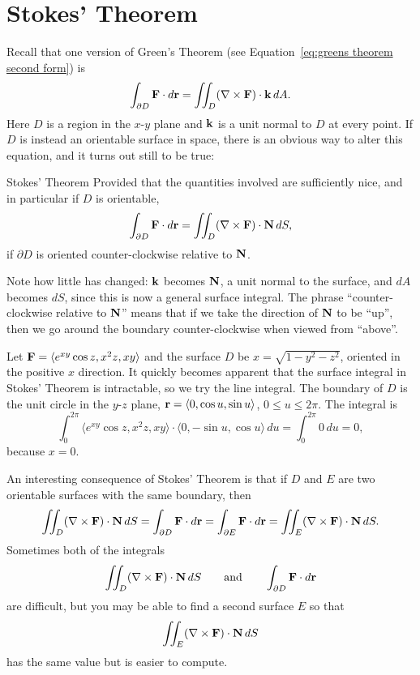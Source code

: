 \section{Stokes' Theorem}\label{sec:StokesTheorem}

Recall that one version of Green's Theorem (see
Equation~\ref{eq:greens theorem second form}) is
$$\int_{\partial D} {\bf F}\cdot d{\bf r}
=\iint_{D}(\nabla\times {\bf F})\cdot{\bf k}\,dA.
$$
Here $D$ is a region in the $x$-$y$ plane and $\bf k$ is a unit normal
to $D$ at every point. If $D$ is instead an orientable surface in
space, there is an obvious way to alter this equation, and it turns
out still to be true:

\begin{theorem}{Stokes' Theorem}{}
Provided that the quantities involved are
sufficiently nice, and in particular if $D$ is orientable, 
$$\int_{\partial D} {\bf F}\cdot d{\bf r}
=\iint_{D}(\nabla\times {\bf F})\cdot{\bf N}\,dS,$$
if $\partial D$ is oriented counter-clockwise relative to $\bf N$.
\end{theorem}

Note how little has changed: $\bf k$ becomes $\bf N$, a unit normal to
the surface, and $dA$ becomes $dS$, since this is now a general
surface integral. The phrase ``counter-clockwise relative to $\bf N$''
means that if we take the direction of $\bf N$ to be ``up'', then we
go around the boundary counter-clockwise when viewed from ``above''.

\begin{example}{}{}
Let ${\bf F}=\langle e^{xy}\cos z,x^2z,xy\rangle$ 
and the surface $D$ be $x=\sqrt{1-y^2-z^2}$, oriented in
the positive $x$ direction.
It quickly becomes apparent that the surface integral in Stokes'
Theorem is intractable, so we try the line integral. The boundary of
$D$ is the unit circle in the $y$-$z$ plane, ${\bf r}=\langle 0,\cos
u,\sin u\rangle$, $0\le u\le 2\pi$. The integral is
$$\int_0^{2\pi} \langle e^{xy}\cos z,x^2z,xy\rangle\cdot
\langle 0,-\sin u,\cos u\rangle\,du=
\int_0^{2\pi} 0\,du = 0,$$
because $x=0$.
\end{example}

An interesting consequence of Stokes' Theorem is that if $D$ and $E$
are two orientable surfaces with the same boundary, then
$$
\iint_{D}(\nabla\times {\bf F})\cdot{\bf N}\,dS
=\int_{\partial D} {\bf F}\cdot d{\bf r}
=\int_{\partial E} {\bf F}\cdot d{\bf r}
=\iint_{E}(\nabla\times {\bf F})\cdot{\bf N}\,dS.
$$
Sometimes both of the integrals 
$$\iint_{D}(\nabla\times {\bf F})\cdot{\bf N}\,dS
\qquad\hbox{and}\qquad\int_{\partial D} {\bf F}\cdot d{\bf r}$$
are difficult, but you may be able to find a second surface $E$ so
that
$$\iint_{E}(\nabla\times {\bf F})\cdot{\bf N}\,dS$$
has the same value but is easier to compute.

